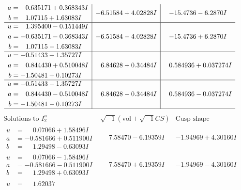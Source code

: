 \documentclass[1p]{elsarticle_modified}
\theoremstyle{definition}
\newcommand{\I}{\sqrt{-1}}
\begin{document}
$$\begin{array}{c|c|c}
\begin{aligned}
a &= -0.635171 + 0.368343 I \\
b &= \phantom{-}1.07115 + 1.63083 I\end{aligned}
 & -6.51584 + 4.02828 I & -15.4736 - 6.2870 I \\ \hline\begin{aligned}
u &= \phantom{-}1.395400 - 0.151449 I \\
a &= -0.635171 - 0.368343 I \\
b &= \phantom{-}1.07115 - 1.63083 I\end{aligned}
 & -6.51584 - 4.02828 I & -15.4736 + 6.2870 I \\ \hline\begin{aligned}
u &= -0.51433 + 1.35727 I \\
a &= \phantom{-}0.844430 + 0.510048 I \\
b &= -1.50481 + 0.10273 I\end{aligned}
 & \phantom{-}6.84628 + 0.34484 I & \phantom{-}0.584936 + 0.037274 I \\ \hline\begin{aligned}
u &= -0.51433 - 1.35727 I \\
a &= \phantom{-}0.844430 - 0.510048 I \\
b &= -1.50481 - 0.10273 I\end{aligned}
 & \phantom{-}6.84628 - 0.34484 I & \phantom{-}0.584936 - 0.037274 I\\
 \hline 
 \end{array}$$\newpage$$\begin{array}{c|c|c}  
\text{Solutions to }I^u_{2}& \I (\text{vol} + \sqrt{-1}CS) & \text{Cusp shape}\\
 \hline 
\begin{aligned}
u &= \phantom{-}0.07066 + 1.58496 I \\
a &= -0.581666 + 0.511900 I \\
b &= \phantom{-}1.29498 - 0.63093 I\end{aligned}
 & \phantom{-}7.58470 - 6.19359 I & -1.94969 + 4.30160 I \\ \hline\begin{aligned}
u &= \phantom{-}0.07066 - 1.58496 I \\
a &= -0.581666 - 0.511900 I \\
b &= \phantom{-}1.29498 + 0.63093 I\end{aligned}
 & \phantom{-}7.58470 + 6.19359 I & -1.94969 - 4.30160 I \\ \hline\begin{aligned}
u &= \phantom{-}1.62037\phantom{ +0.000000I} \\

\end{aligned}
\end{array}$$
\end{document}
